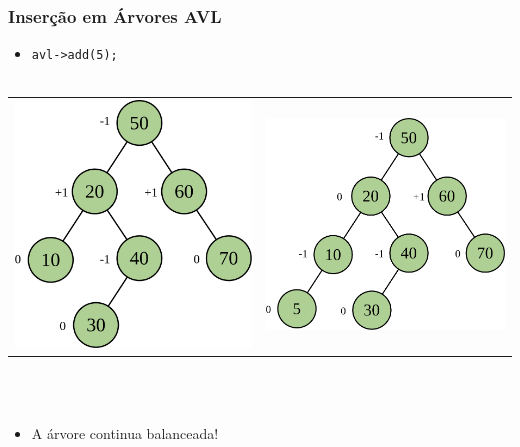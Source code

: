 \documentclass[aspectratio=169]{beamer}
\begin{document}
\begin{frame}[fragile]\frametitle{Inserção em Árvores AVL}
\begin{itemize}
	\item \texttt{avl->add(5);}\\~
\end{itemize}
\begin{tabular}{p{}p{}}
\includegraphics[height=0.5\paperheight]{imagens/avl07c.png} &
\includegraphics[height=0.5\paperheight]{imagens/avl11c.png} \\
\end{tabular}
\\~
\begin{itemize}
	\item A árvore continua balanceada!
\end{itemize}
\end{frame}
\end{document}
